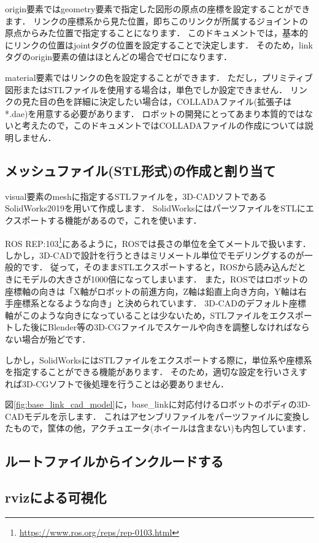 \documentclass[{../../master}]{subfiles}
\begin{document}
\textsf{origin}要素では\textsf{geometry}要素で指定した図形の原点の座標を設定することができます．
リンクの座標系から見た位置，即ちこのリンクが所属するジョイントの原点からみた位置で指定することになります．
このドキュメントでは，基本的にリンクの位置は\textsf{joint}タグの位置を設定することで決定します．
そのため，\textsf{link}タグの\textsf{origin}要素の値はほとんどの場合でゼロになります．

\textsf{material}要素ではリンクの色を設定することができます．
ただし，プリミティブ図形またはSTLファイルを使用する場合は，単色でしか設定できません．
リンクの見た目の色を詳細に決定したい場合は，COLLADAファイル(拡張子は\textsf{*.dae})を用意する必要があります．
ロボットの開発にとってあまり本質的ではないと考えたので，このドキュメントではCOLLADAファイルの作成については説明しません．

\subsection{メッシュファイル(STL形式)の作成と割り当て}
\label{sec:base_link_create_mesh_file}

\textsf{visual}要素の\textsf{mesh}に指定するSTLファイルを，3D-CADソフトであるSolidWorks2019を用いて作成します．
SolidWorksにはパーツファイルをSTLにエクスポートする機能があるので，これを使います．

ROS REP:103\footnote{\url{https://www.ros.org/reps/rep-0103.html}}にあるように，ROSでは長さの単位を全てメートルで扱います．
しかし，3D-CADで設計を行うときはミリメートル単位でモデリングするのが一般的です．
従って，そのままSTLエクスポートすると，ROSから読み込んだときにモデルの大きさが1000倍になってしまいます．
また，ROSではロボットの座標軸の向きは「X軸がロボットの前進方向，Z軸は鉛直上向き方向，Y軸は右手座標系となるような向き」と決められています．
3D-CADのデフォルト座標軸がこのような向きになっていることは少ないため，STLファイルをエクスポートした後にBlender等の3D-CGファイルでスケールや向きを調整しなければならない場合が殆どです．

しかし，SolidWorksにはSTLファイルをエクスポートする際に，単位系や座標系を指定することができる機能があります．
そのため，適切な設定を行いさえすれば3D-CGソフトで後処理を行うことは必要ありません．

図\ref{fig:base_link_cad_model}に，\textsf{base\_link}に対応付けるロボットのボディの3D-CADモデルを示します．
これはアセンブリファイルをパーツファイルに変換したもので，筐体の他，アクチュエータ(ホイールは含まない)も内包しています．

\subsection{ルートファイルからインクルードする}
\label{sec:base_link_include}

\subsection{\textsf{rviz}による可視化}
\end{document}
